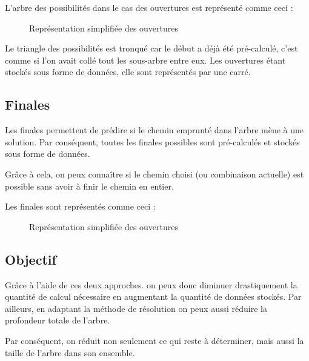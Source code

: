 	L'arbre des possibilités dans le cas des ouvertures est représenté comme ceci :
	
	\begin{figure}[H]
		\begin{center}
				
		\end{center}
		
		\caption{Représentation simplifiée des ouvertures}
		\label{fig:ouvertures}
	\end{figure}
		
	Le triangle des possibilités est tronqué car le début a déjà été pré-calculé, c'est comme si l'on avait collé tout les sous-arbre entre eux. Les ouvertures étant stockés sous forme de données, elle sont représentés par une carré.

	\subsection{Finales}

	Les finales permettent de prédire si le chemin emprunté dans l'arbre mène à une solution. Par conséquent, toutes les finales possibles sont pré-calculés et stockés sous forme de données.
	
	Grâce à cela, on peux connaître si le chemin choisi (ou combinaison actuelle) est possible sans avoir à finir le chemin en entier.
	
	Les finales sont représentés comme ceci :
	
	\begin{figure}[H]
		\begin{center}
				
		\end{center}
		
		\caption{Représentation simplifiée des ouvertures}
		\label{fig:finales}
	\end{figure}
	
	\subsection{Objectif}
	
	Grâce à l'aide de ces deux approches. on peux donc diminuer drastiquement la quantité de calcul nécessaire en augmentant la quantité de données stockés. Par ailleurs, en adaptant la méthode de résolution on peux aussi réduire la profondeur totale de l'arbre.
	
	Par conséquent, on réduit non seulement ce qui reste à déterminer, mais aussi la taille de l'arbre dans son ensemble.
	
